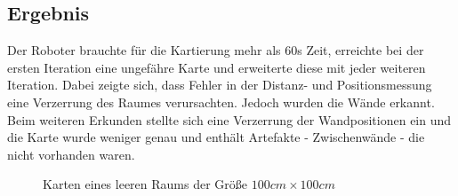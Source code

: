 \documentclass[twoside,11pt, a4paper]{report}
\begin{document}
	\subsection{Ergebnis}
	Der Roboter brauchte für die Kartierung mehr als 60s Zeit, erreichte bei der ersten Iteration eine ungefähre Karte und erweiterte diese mit jeder weiteren Iteration. Dabei zeigte sich, dass Fehler in der Distanz- und Positionsmessung eine Verzerrung des Raumes verursachten. Jedoch wurden die Wände erkannt. Beim weiteren Erkunden stellte sich eine Verzerrung der Wandpositionen ein und die Karte wurde weniger genau und enthält Artefakte - Zwischenwände - die nicht vorhanden waren. 
		\begin{figure}[!htb]
		\centering
		\qquad
		\qquad
		\qquad
		\caption{Karten eines leeren Raums der Größe $100cm \times 100cm$}%
		\label{fig:Karten2}%
	\end{figure}
	
\end{document}
